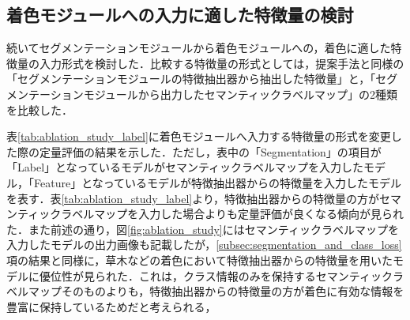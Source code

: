 \documentclass[11pt,dvipdfmx]{ujreport}
\begin{document}
\subsection{着色モジュールへの入力に適した特徴量の検討}
\label{subsec:feature_type}
続いてセグメンテーションモジュールから着色モジュールへの，着色に適した特徴量の入力形式を検討した．比較する特徴量の形式としては，提案手法と同様の「セグメンテーションモジュールの特徴抽出器から抽出した特徴量」と，「セグメンテーションモジュールから出力したセマンティックラベルマップ」の2種類を比較した．\par
表\ref{tab:ablation_study_label}に着色モジュールへ入力する特徴量の形式を変更した際の定量評価の結果を示した．ただし，表中の「Segmentation」の項目が「Label」となっているモデルがセマンティックラベルマップを入力したモデル，「Feature」となっているモデルが特徴抽出器からの特徴量を入力したモデルを表す．表\ref{tab:ablation_study_label}より，特徴抽出器からの特徴量の方がセマンティックラベルマップを入力した場合よりも定量評価が良くなる傾向が見られた．また前述の通り，図\ref{fig:ablation_study}にはセマンティックラベルマップを入力したモデルの出力画像も記載したが，\ref{subsec:segmentation_and_class_loss}項の結果と同様に，草木などの着色において特徴抽出器からの特徴量を用いたモデルに優位性が見られた．これは，クラス情報のみを保持するセマンティックラベルマップそのものよりも，特徴抽出器からの特徴量の方が着色に有効な情報を豊富に保持しているためだと考えられる，

\begin{table}[tb]
\centering
\caption{着色モジュールへ入力する特徴量の形式による定量評価スコアの変化}
\label{tab:ablation_study_label}
\end{table}
\end{document}
